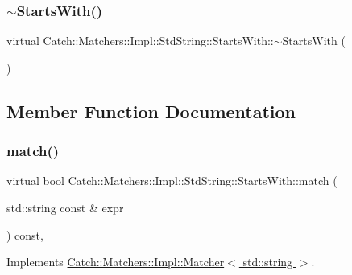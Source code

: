 \subsubsection{\texorpdfstring{$\sim$\+Starts\+With()}{~StartsWith()}}
{\footnotesize\ttfamily virtual Catch\+::\+Matchers\+::\+Impl\+::\+Std\+String\+::\+Starts\+With\+::$\sim$\+Starts\+With (\begin{DoxyParamCaption}{ }\end{DoxyParamCaption})\hspace{0.3cm}{\ttfamily [virtual]}}



\subsection{Member Function Documentation}
\hypertarget{struct_catch_1_1_matchers_1_1_impl_1_1_std_string_1_1_starts_with_ab8f8d15e06d7ec13fee7d9ec4075dafa}{}\label{struct_catch_1_1_matchers_1_1_impl_1_1_std_string_1_1_starts_with_ab8f8d15e06d7ec13fee7d9ec4075dafa} 
\subsubsection{\texorpdfstring{match()}{match()}}
{\footnotesize\ttfamily virtual bool Catch\+::\+Matchers\+::\+Impl\+::\+Std\+String\+::\+Starts\+With\+::match (\begin{DoxyParamCaption}\item[{std\+::string const \&}]{expr }\end{DoxyParamCaption}) const\hspace{0.3cm}{\ttfamily [inline]}, {\ttfamily [virtual]}}



Implements \hyperlink{struct_catch_1_1_matchers_1_1_impl_1_1_matcher_a8c1c5511ce1f3738a45e6901b558f583}{Catch\+::\+Matchers\+::\+Impl\+::\+Matcher$<$ std\+::string $>$}.

